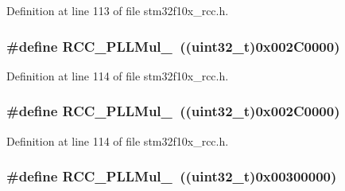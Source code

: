 Definition at line 113 of file stm32f10x\+\_\+rcc.\+h.

\subsubsection[{\texorpdfstring{R\+C\+C\+\_\+\+P\+L\+L\+Mul\+\_\+13}{RCC_PLLMul_13}}]{\setlength{\rightskip}{0pt plus 5cm}\#define R\+C\+C\+\_\+\+P\+L\+L\+Mul\+\_~(({\bf uint32\+\_\+t})0x002\+C0000)}\hypertarget{group___p_l_l__multiplication__factor_ga78b3638b79c30920c09f18206daafc7a}{}\label{group___p_l_l__multiplication__factor_ga78b3638b79c30920c09f18206daafc7a}


Definition at line 114 of file stm32f10x\+\_\+rcc.\+h.

\subsubsection[{\texorpdfstring{R\+C\+C\+\_\+\+P\+L\+L\+Mul\+\_\+13}{RCC_PLLMul_13}}]{\setlength{\rightskip}{0pt plus 5cm}\#define R\+C\+C\+\_\+\+P\+L\+L\+Mul\+\_~(({\bf uint32\+\_\+t})0x002\+C0000)}\hypertarget{group___p_l_l__multiplication__factor_ga78b3638b79c30920c09f18206daafc7a}{}\label{group___p_l_l__multiplication__factor_ga78b3638b79c30920c09f18206daafc7a}


Definition at line 114 of file stm32f10x\+\_\+rcc.\+h.

\subsubsection[{\texorpdfstring{R\+C\+C\+\_\+\+P\+L\+L\+Mul\+\_\+14}{RCC_PLLMul_14}}]{\setlength{\rightskip}{0pt plus 5cm}\#define R\+C\+C\+\_\+\+P\+L\+L\+Mul\+\_~(({\bf uint32\+\_\+t})0x00300000)}\hypertarget{group___p_l_l__multiplication__factor_ga457e11adfe1e815eeb5f38de61a94328}{}\label{group___p_l_l__multiplication__factor_ga457e11adfe1e815eeb5f38de61a94328}


